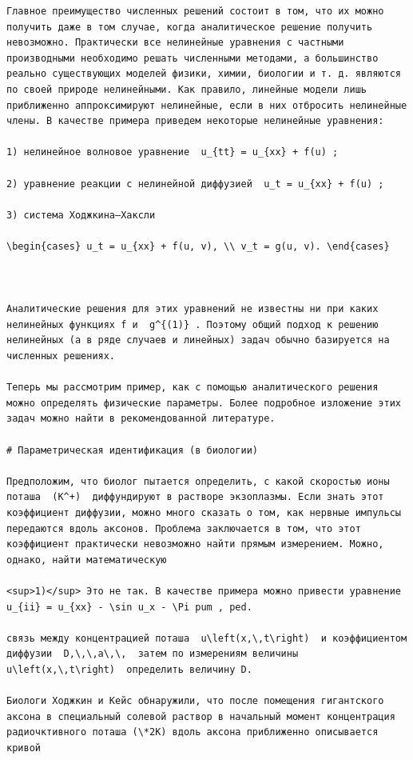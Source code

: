 \documentclass[
  ukrainian,
]{article}
\begin{document}
\begin{verbatim}
Главное преимущество численных решений состоит в том, что их можно получить даже в том случае, когда аналитическое решение получить невозможно. Практически все нелинейные уравнения с частными производными необходимо решать численными методами, а большинство реально существующих моделей физики, химии, биологии и т. д. являются по своей природе нелинейными. Как правило, линейные модели лишь приближенно аппроксимируют нелинейные, если в них отбросить нелинейные члены. В качестве примера приведем некоторые нелинейные уравнения:

1) нелинейное волновое уравнение  u_{tt} = u_{xx} + f(u) ;

2) уравнение реакции с нелинейной диффузией  u_t = u_{xx} + f(u) ;

3) система Ходжкина—Хаксли  

\begin{cases} u_t = u_{xx} + f(u, v), \\ v_t = g(u, v). \end{cases}

  

Аналитические решения для этих уравнений не известны ни при каких нелинейных функциях f и  g^{(1)} . Поэтому общий подход к решению нелинейных (а в ряде случаев и линейных) задач обычно базируется на численных решениях.

Теперь мы рассмотрим пример, как с помощью аналитического решения можно определять физические параметры. Более подробное изложение этих задач можно найти в рекомендованной литературе.

# Параметрическая идентификация (в биологии)

Предположим, что биолог пытается определить, с какой скоростью ионы поташа  (K^+)  диффундируют в растворе экзоплазмы. Если знать этот коэффициент диффузии, можно много сказать о том, как нервные импульсы передаются вдоль аксонов. Проблема заключается в том, что этот коэффициент практически невозможно найти прямым измерением. Можно, однако, найти математическую

<sup>1)</sup> Это не так. В качестве примера можно привести уравнение  u_{ii} = u_{xx} - \sin u_x - \Pi pum , ped.

связь между концентрацией поташа  u\left(x,\,t\right)  и коэффициентом диффузии  D,\,\,a\,\,  затем по измерениям величины  u\left(x,\,t\right)  определить величину D.

Биологи Ходжкин и Кейс обнаружили, что после помещения гигантского аксона в специальный солевой раствор в начальный момент концентрация радиочктивного поташа (\*2K) вдоль аксона приближенно описывается кривой


\end{verbatim}
\end{document}

